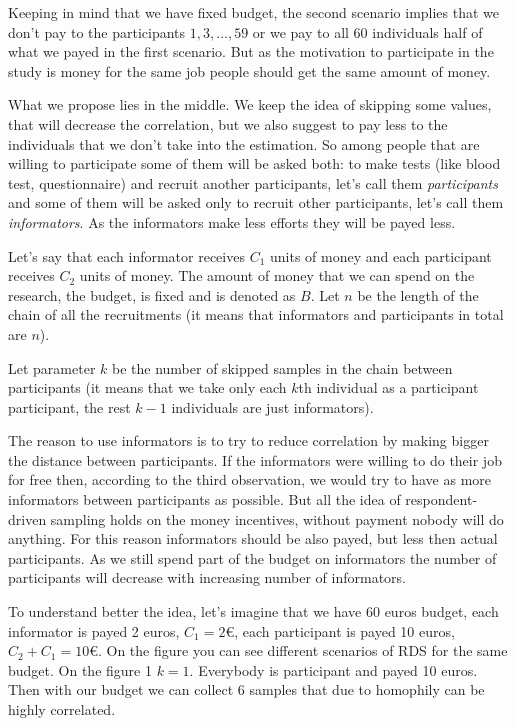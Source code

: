 \documentclass[12pt]{report}
\begin{document}
Keeping in mind that we have fixed budget, the second scenario implies that we don't pay to the participants $1, 3, ..., 59$ or we pay to all 60 individuals half of what we payed in the first scenario. But as the motivation to participate in the study is money for the same job people should get the same amount of money.

What we propose lies in the middle. We keep the idea of skipping some values, that will decrease the correlation, but we also suggest to pay less to the individuals that we don't take into the estimation. 
So among people that are willing to participate some of them will be asked both: to make tests (like blood test, questionnaire) and recruit another participants, let's call them \textit{participants} and some of them will be asked only to recruit other participants, let's call them \textit{informators}. As the informators make less efforts they will be payed less. 


Let's say that each informator receives $C_1$  units of money and each participant receives $C_2$ units of money. The amount of money that we can spend on the research, the budget, is fixed and is denoted as $B$. 
Let $n$ be the length of the chain of all the recruitments (it means that informators and participants in total are $n$).

Let parameter $k$ be the number of skipped samples in the chain between participants (it means that we take only each $k$th individual as a participant participant, the rest $k-1$ individuals are just informators).

The reason to use informators is to try to reduce correlation by making bigger the distance between participants. If the informators were willing to do their job for free then, according to the third observation, we would try to have as more informators between participants as possible. But all the idea of respondent-driven sampling holds on the money incentives, without payment nobody will do anything. For this reason informators should be also payed, but less then actual participants. As we still spend part of the budget on informators the number of participants will decrease with increasing number of informators. 

To understand better the idea, let's imagine that we have 60 euros budget, each informator is payed 2 euros, $C_1 = 2$\euro, each participant is payed 10 euros, $C_2 + C_1 = 10$\euro. On the figure you can see different scenarios of RDS for the same budget. 
On the figure 1 $k = 1$. Everybody is participant and payed 10 euros. Then with our budget we can collect 6 samples that due to homophily can be highly correlated.
\end{document}
